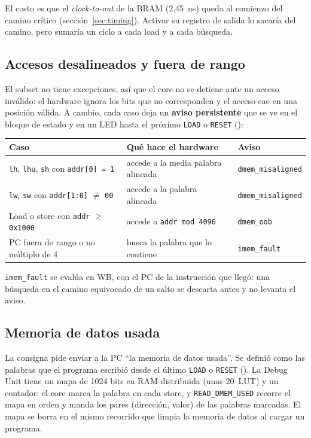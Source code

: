 El costo es que el \emph{clock-to-out} de la BRAM (2,45~ns) queda al comienzo del camino crítico
(sección~\ref{sec:timing}). Activar su registro de salida lo sacaría del camino, pero sumaría un
ciclo a cada load y a cada búsqueda.

\subsection{Accesos desalineados y fuera de rango}

El subset no tiene excepciones, así que el core no se detiene ante un acceso inválido: el hardware
ignora los bits que no corresponden y el acceso cae en una posición válida. A cambio, cada caso
deja un \textbf{aviso persistente} que se ve en el bloque de estado y en un LED hasta el próximo
\texttt{LOAD} o \texttt{RESET} ():

\begin{center}
\small
\begin{tabular}{@{}p{5.6cm} p{5.6cm} l@{}}
  \toprule
  \textbf{Caso} & \textbf{Qué hace el hardware} & \textbf{Aviso} \\
  \midrule
  \texttt{lh}, \texttt{lhu}, \texttt{sh} con \texttt{addr[0] = 1} & accede a la media palabra alineada & \texttt{dmem\_misaligned} \\
  \texttt{lw}, \texttt{sw} con \texttt{addr[1:0]} $\neq$ \texttt{00} & accede a la palabra alineada & \texttt{dmem\_misaligned} \\
  Load o store con \texttt{addr} $\geq$ \texttt{0x1000} & accede a \texttt{addr mod 4096} & \texttt{dmem\_oob} \\
  PC fuera de rango o no múltiplo de 4 & busca la palabra que lo contiene & \texttt{imem\_fault} \\
  \bottomrule
\end{tabular}
\end{center}

\texttt{imem\_fault} se evalúa en WB, con el PC de la instrucción que llegó: una búsqueda en el
camino equivocado de un salto se descarta antes y no levanta el aviso.

\subsection{Memoria de datos usada}

La consigna pide enviar a la PC ``la memoria de datos usada''. Se definió como las palabras que el
programa escribió desde el último \texttt{LOAD} o \texttt{RESET} (). La Debug Unit
tiene un mapa de 1024 bits en RAM distribuida (unas 20~LUT) y un contador: el core marca la palabra
en cada store, y \texttt{READ\_DMEM\_USED} recorre el mapa en orden y manda los pares
(dirección, valor) de las palabras marcadas. El mapa se borra en el mismo recorrido que limpia la
memoria de datos al cargar un programa.

